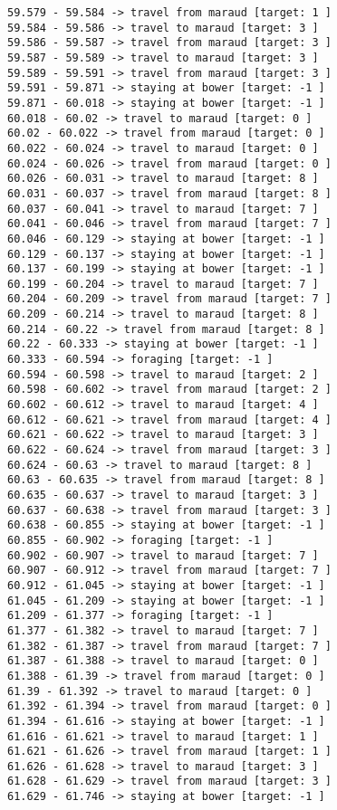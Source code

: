 \documentclass[11pt]{article}
\begin{document}
\begin{Verbatim}[commandchars=\\\{\}]
59.579 - 59.584 -> travel from maraud [target: 1 ]
59.584 - 59.586 -> travel to maraud [target: 3 ]
59.586 - 59.587 -> travel from maraud [target: 3 ]
59.587 - 59.589 -> travel to maraud [target: 3 ]
59.589 - 59.591 -> travel from maraud [target: 3 ]
59.591 - 59.871 -> staying at bower [target: -1 ]
59.871 - 60.018 -> staying at bower [target: -1 ]
60.018 - 60.02 -> travel to maraud [target: 0 ]
60.02 - 60.022 -> travel from maraud [target: 0 ]
60.022 - 60.024 -> travel to maraud [target: 0 ]
60.024 - 60.026 -> travel from maraud [target: 0 ]
60.026 - 60.031 -> travel to maraud [target: 8 ]
60.031 - 60.037 -> travel from maraud [target: 8 ]
60.037 - 60.041 -> travel to maraud [target: 7 ]
60.041 - 60.046 -> travel from maraud [target: 7 ]
60.046 - 60.129 -> staying at bower [target: -1 ]
60.129 - 60.137 -> staying at bower [target: -1 ]
60.137 - 60.199 -> staying at bower [target: -1 ]
60.199 - 60.204 -> travel to maraud [target: 7 ]
60.204 - 60.209 -> travel from maraud [target: 7 ]
60.209 - 60.214 -> travel to maraud [target: 8 ]
60.214 - 60.22 -> travel from maraud [target: 8 ]
60.22 - 60.333 -> staying at bower [target: -1 ]
60.333 - 60.594 -> foraging [target: -1 ]
60.594 - 60.598 -> travel to maraud [target: 2 ]
60.598 - 60.602 -> travel from maraud [target: 2 ]
60.602 - 60.612 -> travel to maraud [target: 4 ]
60.612 - 60.621 -> travel from maraud [target: 4 ]
60.621 - 60.622 -> travel to maraud [target: 3 ]
60.622 - 60.624 -> travel from maraud [target: 3 ]
60.624 - 60.63 -> travel to maraud [target: 8 ]
60.63 - 60.635 -> travel from maraud [target: 8 ]
60.635 - 60.637 -> travel to maraud [target: 3 ]
60.637 - 60.638 -> travel from maraud [target: 3 ]
60.638 - 60.855 -> staying at bower [target: -1 ]
60.855 - 60.902 -> foraging [target: -1 ]
60.902 - 60.907 -> travel to maraud [target: 7 ]
60.907 - 60.912 -> travel from maraud [target: 7 ]
60.912 - 61.045 -> staying at bower [target: -1 ]
61.045 - 61.209 -> staying at bower [target: -1 ]
61.209 - 61.377 -> foraging [target: -1 ]
61.377 - 61.382 -> travel to maraud [target: 7 ]
61.382 - 61.387 -> travel from maraud [target: 7 ]
61.387 - 61.388 -> travel to maraud [target: 0 ]
61.388 - 61.39 -> travel from maraud [target: 0 ]
61.39 - 61.392 -> travel to maraud [target: 0 ]
61.392 - 61.394 -> travel from maraud [target: 0 ]
61.394 - 61.616 -> staying at bower [target: -1 ]
61.616 - 61.621 -> travel to maraud [target: 1 ]
61.621 - 61.626 -> travel from maraud [target: 1 ]
61.626 - 61.628 -> travel to maraud [target: 3 ]
61.628 - 61.629 -> travel from maraud [target: 3 ]
61.629 - 61.746 -> staying at bower [target: -1 ]

\end{Verbatim}
\end{document}
